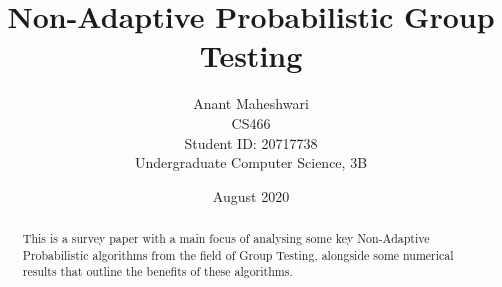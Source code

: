 \documentclass[12pt]{article}
\title{Non-Adaptive Probabilistic Group Testing}
\author{Anant Maheshwari\\CS466\\Student ID: 20717738\\Undergraduate Computer Science, 3B}
\date{August 2020}
\begin{document}
\maketitle

\begin{abstract}
This is a survey paper with a main focus of analysing some key Non-Adaptive Probabilistic algorithms from the field of Group Testing, alongside some numerical results that outline the benefits of these algorithms.   
\end{abstract}

\end{document}
